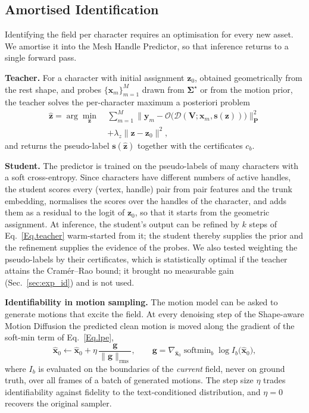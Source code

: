\documentclass[lettersize,journal]{IEEEtran}
\newenvironment{revblock}{\par\color{red}}{\par}
\begin{document}
\begin{revblock}
\subsection{Amortised Identification} \label{sec:amortise}
Identifying the field per character requires an optimisation for every new asset. We amortise
it into the Mesh Handle Predictor, so that inference returns to a single forward pass.

\textbf{Teacher.} For a character with initial assignment $\bm{z}_{0}$, obtained geometrically
from the rest shape, and probes $\{\bm{x}_{m}\}_{m=1}^{M}$ drawn from $\bm{\Sigma}^{\star}$ or from
the motion prior, the teacher solves the per-character maximum a posteriori problem
\begin{equation} \label{Eq.teacher}
\begin{aligned}
\hat{\bm{z}}=\arg\min_{\bm{z}}\ &\sum_{m=1}^{M}\big\lVert\bm{y}_{m}-\mathcal{O}\big(
\mathcal{D}(\bm{V};\bm{x}_{m},\bm{s}(\bm{z}))\big)\big\rVert^{2}_{\bm{P}}\\
&+\lambda_{z}\lVert\bm{z}-\bm{z}_{0}\rVert^{2},
\end{aligned}
\end{equation}
and returns the pseudo-label $\bm{s}(\hat{\bm{z}})$ together with the certificates $c_{b}$.

\textbf{Student.} The predictor is trained on the pseudo-labels of many characters with a soft
cross-entropy. Since characters have different numbers of active handles, the student scores
every (vertex, handle) pair from pair features and the trunk embedding, normalises the scores over
the handles of the character, and adds them as a residual to the logit of $\bm{z}_{0}$, so that it
starts from the geometric assignment. At inference, the student's output can be refined by $k$
steps of Eq.~\ref{Eq.teacher} warm-started from it; the student thereby supplies the prior and
the refinement supplies the evidence of the probes. We also tested weighting the pseudo-labels by
their certificates, which is statistically optimal if the teacher attains the Cram\'er--Rao
bound; it brought no measurable gain (Sec.~\ref{sec:exp_id}) and is not used.

\textbf{Identifiability in motion sampling.} The motion model can be asked to generate motions
that excite the field. At every denoising step of the Shape-aware Motion Diffusion the predicted
clean motion is moved along the gradient of the soft-min term of Eq.~\ref{Eq.lpe},
\begin{equation} \label{Eq.guide}
\hat{\bm{x}}_{0}\leftarrow\hat{\bm{x}}_{0}+\eta\,\frac{\bm{g}}{\lVert\bm{g}\rVert_{\text{rms}}},
\qquad
\bm{g}=\nabla_{\hat{\bm{x}}_{0}}\operatorname{softmin}_{b}\log I_{b}\big(\hat{\bm{x}}_{0}\big),
\end{equation}
where $I_{b}$ is evaluated on the boundaries of the \textit{current} field, never on ground truth,
over all frames of a batch of generated motions. The step size $\eta$ trades identifiability
against fidelity to the text-conditioned distribution, and $\eta=0$ recovers the original sampler.


\end{revblock}
\end{document}
